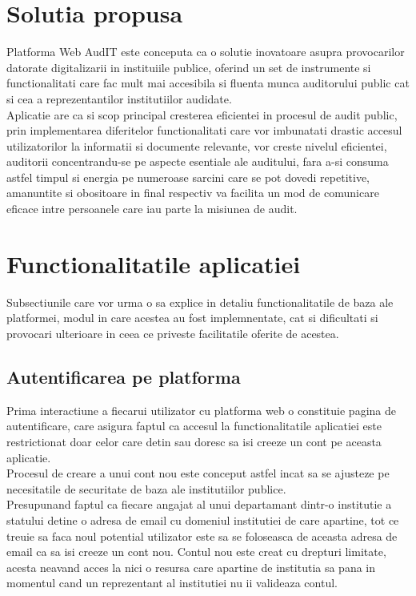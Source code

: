 \section{Solutia propusa}
Platforma Web AudIT este conceputa ca o solutie inovatoare asupra provocarilor datorate digitalizarii in instituiile publice, oferind un set de instrumente si functionalitati care fac mult mai accesibila si fluenta munca auditorului public cat si cea a reprezentantilor institutiilor audidate.\\
Aplicatie are ca si scop principal cresterea eficientei in procesul de audit public, prin implementarea diferitelor functionalitati care vor imbunatati drastic accesul utilizatorilor la informatii si documente relevante, vor creste nivelul eficientei, auditorii concentrandu-se pe aspecte esentiale ale auditului, fara a-si consuma  astfel timpul si energia pe numeroase sarcini care se pot dovedi repetitive, amanuntite si obositoare in final	respectiv va facilita un mod de comunicare eficace intre persoanele care iau parte la misiunea de audit.



\section{Functionalitatile aplicatiei}
Subsectiunile care vor urma o sa explice in detaliu functionalitatile de baza ale platformei,
modul in care acestea au fost implemnentate, cat si dificultati si provocari ulterioare in ceea ce priveste facilitatile oferite de acestea.

\subsection{Autentificarea pe platforma}
Prima interactiune a fiecarui utilizator cu platforma web o constituie pagina de autentificare, care asigura faptul ca accesul la functionalitatile aplicatiei este restrictionat doar celor care detin sau doresc sa isi creeze un cont pe aceasta aplicatie.\\
Procesul de creare a unui cont nou este conceput astfel incat sa se ajusteze pe necesitatile de securitate de baza ale institutiilor publice.\\
 Presupunand faptul ca fiecare angajat al unui departamant dintr-o institutie a statului detine o adresa de email cu domeniul institutiei de care apartine, tot ce treuie sa faca noul potential utilizator este sa se foloseasca de aceasta adresa de email ca sa isi creeze un cont nou. Contul nou este creat cu drepturi limitate, acesta neavand acces la nici o resursa care apartine de institutia sa pana in momentul cand un reprezentant al institutiei nu ii valideaza contul.
 
